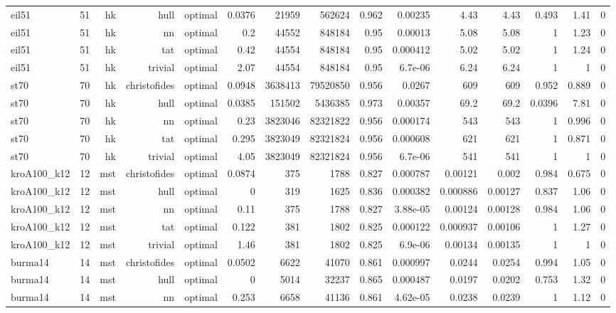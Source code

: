 \begin{tabular}{lrrrrrrrrrrrrrr}
eil51 & 51 & hk & hull & optimal & 0.0376 & 21959 & 562624 & 0.962 & 0.00235 & 4.43 & 4.43 & 0.493 & 1.41 & 0 \\
eil51 & 51 & hk & nn & optimal & 0.2 & 44552 & 848184 & 0.95 & 0.00013 & 5.08 & 5.08 & 1 & 1.23 & 0 \\
eil51 & 51 & hk & tat & optimal & 0.42 & 44554 & 848184 & 0.95 & 0.000412 & 5.02 & 5.02 & 1 & 1.24 & 0 \\
eil51 & 51 & hk & trivial & optimal & 2.07 & 44554 & 848184 & 0.95 & 6.7e-06 & 6.24 & 6.24 & 1 & 1 & 0 \\
st70 & 70 & hk & christofides & optimal & 0.0948 & 3638413 & 79520850 & 0.956 & 0.0267 & 609 & 609 & 0.952 & 0.889 & 0 \\
st70 & 70 & hk & hull & optimal & 0.0385 & 151502 & 5436385 & 0.973 & 0.00357 & 69.2 & 69.2 & 0.0396 & 7.81 & 0 \\
st70 & 70 & hk & nn & optimal & 0.23 & 3823046 & 82321822 & 0.956 & 0.000174 & 543 & 543 & 1 & 0.996 & 0 \\
st70 & 70 & hk & tat & optimal & 0.295 & 3823049 & 82321824 & 0.956 & 0.000608 & 621 & 621 & 1 & 0.871 & 0 \\
st70 & 70 & hk & trivial & optimal & 4.05 & 3823049 & 82321824 & 0.956 & 6.7e-06 & 541 & 541 & 1 & 1 & 0 \\
kroA100\_k12 & 12 & mst & christofides & optimal & 0.0874 & 375 & 1788 & 0.827 & 0.000787 & 0.00121 & 0.002 & 0.984 & 0.675 & 0 \\
kroA100\_k12 & 12 & mst & hull & optimal & 0 & 319 & 1625 & 0.836 & 0.000382 & 0.000886 & 0.00127 & 0.837 & 1.06 & 0 \\
kroA100\_k12 & 12 & mst & nn & optimal & 0.11 & 375 & 1788 & 0.827 & 3.88e-05 & 0.00124 & 0.00128 & 0.984 & 1.06 & 0 \\
kroA100\_k12 & 12 & mst & tat & optimal & 0.122 & 381 & 1802 & 0.825 & 0.000122 & 0.000937 & 0.00106 & 1 & 1.27 & 0 \\
kroA100\_k12 & 12 & mst & trivial & optimal & 1.46 & 381 & 1802 & 0.825 & 6.9e-06 & 0.00134 & 0.00135 & 1 & 1 & 0 \\
burma14 & 14 & mst & christofides & optimal & 0.0502 & 6622 & 41070 & 0.861 & 0.000997 & 0.0244 & 0.0254 & 0.994 & 1.05 & 0 \\
burma14 & 14 & mst & hull & optimal & 0 & 5014 & 32237 & 0.865 & 0.000487 & 0.0197 & 0.0202 & 0.753 & 1.32 & 0 \\
burma14 & 14 & mst & nn & optimal & 0.253 & 6658 & 41136 & 0.861 & 4.62e-05 & 0.0238 & 0.0239 & 1 & 1.12 & 0 \\

\end{tabular}
